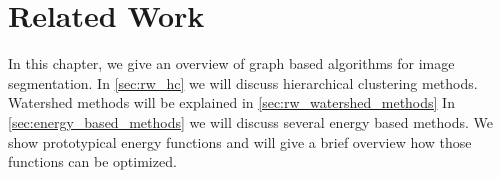 \chapter{Related Work} \label{ch:reated_work}

In this chapter, we give an overview of graph based algorithms
for image segmentation.
In \cref{sec:rw_hc} we will discuss hierarchical clustering 
methods.
Watershed methods will be explained in \cref{sec:rw_watershed_methods}
In \cref{sec:energy_based_methods} we will discuss
several energy based methods.
We show prototypical energy functions and
will give a brief overview how those functions can
be optimized.




% 

 

 

 

% 

% 





